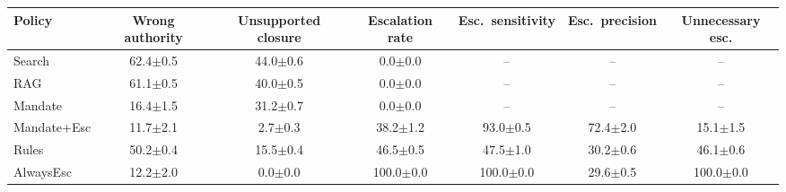 \begin{tabular}{lcccccc}
\toprule
Policy & Wrong authority & Unsupported closure & Escalation rate & Esc.\ sensitivity & Esc.\ precision & Unnecessary esc.\\
\midrule
Search & 62.4$\pm$0.5 & 44.0$\pm$0.6 & 0.0$\pm$0.0 & -- & -- & --\\
RAG & 61.1$\pm$0.5 & 40.0$\pm$0.5 & 0.0$\pm$0.0 & -- & -- & --\\
Mandate & 16.4$\pm$1.5 & 31.2$\pm$0.7 & 0.0$\pm$0.0 & -- & -- & --\\
Mandate+Esc & 11.7$\pm$2.1 & 2.7$\pm$0.3 & 38.2$\pm$1.2 & 93.0$\pm$0.5 & 72.4$\pm$2.0 & 15.1$\pm$1.5\\
Rules & 50.2$\pm$0.4 & 15.5$\pm$0.4 & 46.5$\pm$0.5 & 47.5$\pm$1.0 & 30.2$\pm$0.6 & 46.1$\pm$0.6\\
AlwaysEsc & 12.2$\pm$2.0 & 0.0$\pm$0.0 & 100.0$\pm$0.0 & 100.0$\pm$0.0 & 29.6$\pm$0.5 & 100.0$\pm$0.0\\
\bottomrule
\end{tabular}
